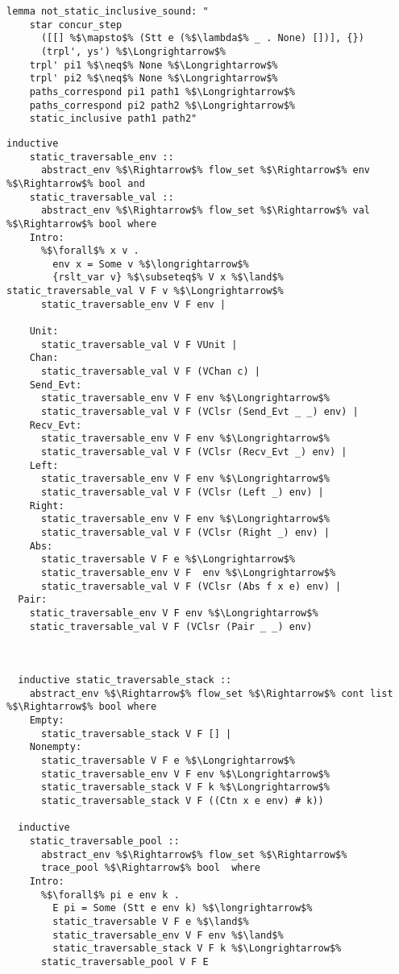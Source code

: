 \documentclass{article}
\begin{document}
\begin{lstlisting}[style=codestyle1, escapechar=\%]
  lemma not_static_inclusive_sound: "
    star concur_step
      ([[] %$\mapsto$% (Stt e (%$\lambda$% _ . None) [])], {})
      (trpl', ys') %$\Longrightarrow$% 
    trpl' pi1 %$\neq$% None %$\Longrightarrow$% 
    trpl' pi2 %$\neq$% None %$\Longrightarrow$% 
    paths_correspond pi1 path1 %$\Longrightarrow$%
    paths_correspond pi2 path2 %$\Longrightarrow$%
    static_inclusive path1 path2"

  \end{lstlisting}

\begin{lstlisting}[style=codestyle1, escapechar=\%]
  inductive 
    static_traversable_env ::
      abstract_env %$\Rightarrow$% flow_set %$\Rightarrow$% env %$\Rightarrow$% bool and
    static_traversable_val ::
      abstract_env %$\Rightarrow$% flow_set %$\Rightarrow$% val %$\Rightarrow$% bool where
    Intro:
      %$\forall$% x v .
        env x = Some v %$\longrightarrow$%
        {rslt_var v} %$\subseteq$% V x %$\land$% static_traversable_val V F v %$\Longrightarrow$%
      static_traversable_env V F env |

    Unit:
      static_traversable_val V F VUnit |
    Chan:
      static_traversable_val V F (VChan c) |
    Send_Evt:
      static_traversable_env V F env %$\Longrightarrow$%
      static_traversable_val V F (VClsr (Send_Evt _ _) env) |
    Recv_Evt:
      static_traversable_env V F env %$\Longrightarrow$%
      static_traversable_val V F (VClsr (Recv_Evt _) env) |
    Left:
      static_traversable_env V F env %$\Longrightarrow$%
      static_traversable_val V F (VClsr (Left _) env) |
    Right:
      static_traversable_env V F env %$\Longrightarrow$%
      static_traversable_val V F (VClsr (Right _) env) |
    Abs:
      static_traversable V F e %$\Longrightarrow$% 
      static_traversable_env V F  env %$\Longrightarrow$%
      static_traversable_val V F (VClsr (Abs f x e) env) |
  Pair:
    static_traversable_env V F env %$\Longrightarrow$%
    static_traversable_val V F (VClsr (Pair _ _) env) 



  inductive static_traversable_stack ::
    abstract_env %$\Rightarrow$% flow_set %$\Rightarrow$% cont list %$\Rightarrow$% bool where
    Empty:
      static_traversable_stack V F [] |
    Nonempty:
      static_traversable V F e %$\Longrightarrow$%
      static_traversable_env V F env %$\Longrightarrow$%
      static_traversable_stack V F k %$\Longrightarrow$% 
      static_traversable_stack V F ((Ctn x e env) # k))

  inductive
    static_traversable_pool ::
      abstract_env %$\Rightarrow$% flow_set %$\Rightarrow$%
      trace_pool %$\Rightarrow$% bool  where
    Intro:
      %$\forall$% pi e env k .
        E pi = Some (Stt e env k) %$\longrightarrow$% 
        static_traversable V F e %$\land$%
        static_traversable_env V F env %$\land$%
        static_traversable_stack V F k %$\Longrightarrow$% 
      static_traversable_pool V F E

  \end{lstlisting}
\end{document}
